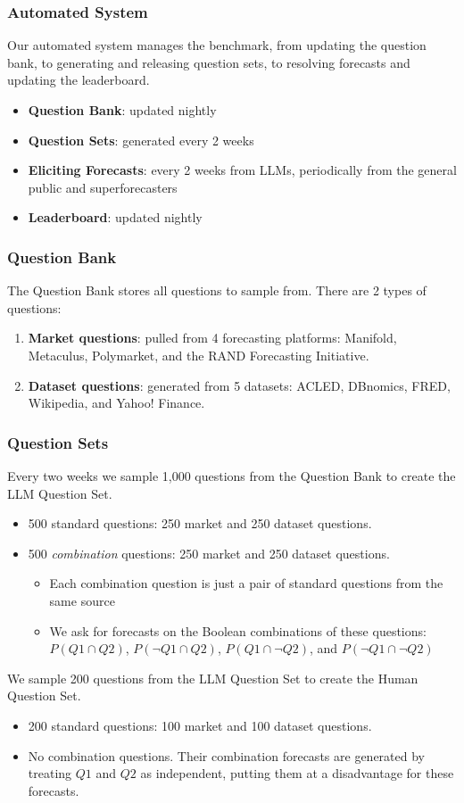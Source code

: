 \documentclass[aspectratio=169]{beamer}
\begin{document}
\begin{frame}
  \frametitle{Automated System}
  Our automated system manages the benchmark, from updating the question bank, to generating and releasing question sets, to resolving forecasts and updating the leaderboard.
  \begin{itemize}
  \item \textbf{Question Bank}: updated nightly
  \item \textbf{Question Sets}: generated every 2 weeks
  \item \textbf{Eliciting Forecasts}: every 2 weeks from LLMs, periodically from the general public and superforecasters
  \item \textbf{Leaderboard}: updated nightly
  \end{itemize}
\end{frame}




\begin{frame}
  \frametitle{Question Bank}
  The Question Bank stores all questions to sample from. There are 2 types of questions:
  \begin{enumerate}
  \item \textbf{Market questions}: pulled from 4 forecasting platforms: Manifold, Metaculus, Polymarket, and the RAND Forecasting Initiative.
    \item \textbf{Dataset questions}: generated from 5 datasets: ACLED, DBnomics, FRED, Wikipedia, and Yahoo! Finance.
  \end{enumerate}

\end{frame}


\begin{frame}
  \frametitle{Question Sets}
  Every two weeks we sample 1,000 questions from the Question Bank to create the LLM Question Set.
  \begin{itemize}
  \item 500 standard questions: 250 market and 250 dataset questions.
  \item 500 \textit{combination} questions: 250 market and 250 dataset questions.
    \begin{itemize}
      \item Each combination question is just a pair of standard questions from the same source
      \item We ask for forecasts on the Boolean combinations of these questions: $P(Q1\cap Q2)$, $P(\neg Q1\cap Q2)$, $P(Q1\cap \neg Q2)$, and $P(\neg Q1\cap \neg Q2)$
    \end{itemize}
  \end{itemize}

  We sample 200 questions from the LLM Question Set to create the Human Question Set.
  \begin{itemize}
  \item 200 standard questions: 100 market and 100 dataset questions.
  \item No combination questions. Their combination forecasts are generated by treating $Q1$ and $Q2$ as independent, putting them at a disadvantage for these forecasts.
  \end{itemize}

\end{frame}
\end{document}
